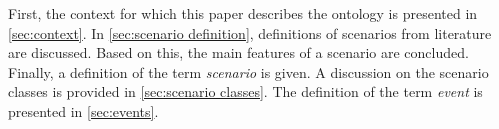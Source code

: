 First, the context for which this paper describes the ontology is presented in \cref{sec:context}. In \cref{sec:scenario definition}, definitions of scenarios from literature are discussed. Based on this, the main features of a scenario are concluded. Finally, a definition of the term \emph{scenario} is given. A discussion on the scenario classes is provided in \cref{sec:scenario classes}. The definition of the term \emph{event} is presented in \cref{sec:events}.





